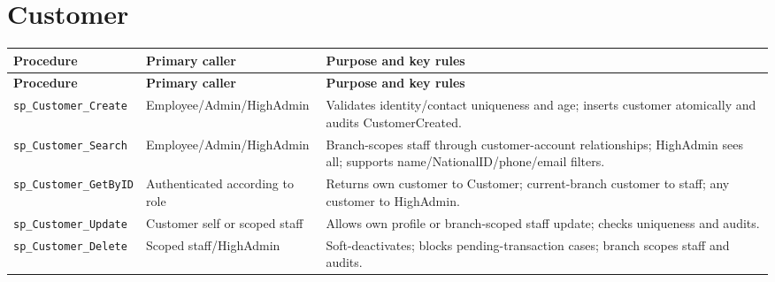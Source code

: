 \documentclass[11pt,a4paper,oneside]{report}
\begin{document}
\section{Customer}
\begingroup
\footnotesize
\setlength{\tabcolsep}{4pt}
\renewcommand{\arraystretch}{1.08}
\begin{longtable}{L{0.30\textwidth}L{0.22\textwidth}L{0.41\textwidth}}
\toprule\textbf{Procedure} & \textbf{Primary caller} & \textbf{Purpose and key rules}\\\midrule\endfirsthead
\toprule\textbf{Procedure} & \textbf{Primary caller} & \textbf{Purpose and key rules}\\\midrule\endhead
\nolinkurl{sp_Customer_Create} & Employee\slash Admin\slash HighAdmin & Validates identity\slash contact uniqueness and age; inserts customer atomically and audits CustomerCreated.\\
\nolinkurl{sp_Customer_Search} & Employee\slash Admin\slash HighAdmin & Branch-scopes staff through customer-account relationships; HighAdmin sees all; supports name\slash NationalID\slash phone\slash email filters.\\
\nolinkurl{sp_Customer_GetByID} & Authenticated according to role & Returns own customer to Customer; current-branch customer to staff; any customer to HighAdmin.\\
\nolinkurl{sp_Customer_Update} & Customer self or scoped staff & Allows own profile or branch-scoped staff update; checks uniqueness and audits.\\
\nolinkurl{sp_Customer_Delete} & Scoped staff\slash HighAdmin & Soft-deactivates; blocks pending-transaction cases; branch scopes staff and audits.\\
\bottomrule
\end{longtable}
\endgroup
\end{document}
